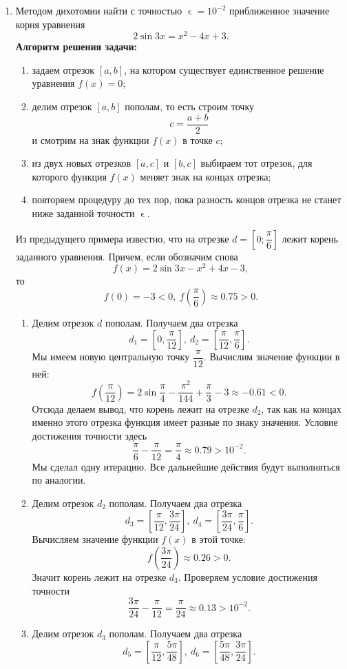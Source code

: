 \documentclass[a4paper, 12pt]{report}
\renewcommand{\epsilon}{\upvarepsilon}
\begin{document}
\begin{enumerate}
		\item Методом дихотомии найти с точностью $\epsilon=10^{-2}$ приближенное значение корня уравнения $$2\sin3x = x^2 - 4x + 3.$$
		\textbf{Алгоритм решения задачи:}
		\begin{enumerate}
			\item задаем отрезок $[a,b]$, на котором существует единственное решение уравнения $f(x) = 0$;
			\item делим отрезок $[a,b]$ пополам, то есть строим точку $$c = \dfrac{a+b}{2}$$ и смотрим на знак функции $f(x)$ в точке $c$;
			\item из двух новых отрезков $[a,c]$ и $[b,c]$ выбираем тот отрезок, для которого функция $f(x)$ меняет знак на концах отрезка;
			\item повторяем процедуру до тех пор, пока разность концов отрезка не станет ниже заданной точности $\epsilon$.
		\end{enumerate}
		Из предыдущего примера известно, что на отрезке $d = \left[0; \dfrac\pi6\right]$ лежит корень заданного уравнения. Причем, если обозначим снова $$f(x) = 2\sin 3x - x^2 + 4x - 3,$$ то $$f(0) = -3 < 0,\ f\left(\dfrac \pi 6\right)\approx 0.75 > 0.$$
		\begin{enumerate}
			\item Делим отрезок $d$ пополам. Получаем два отрезка $$d_1 = \left[0, \dfrac \pi {12}\right],\ d_2 = \left[\dfrac \pi {12}, \dfrac \pi {6}\right].$$ 
			Мы имеем новую центральную точку $\dfrac \pi {12}$. Вычислим значение функции в ней: $$f\left(\dfrac{\pi}{12}\right) = 2\sin \dfrac{\pi}{4} - \dfrac{\pi^2}{144} + \dfrac{\pi}3 - 3 \approx -0.61 < 0.$$
			Отсюда делаем вывод, что корень лежит на отрезке $d_2$, так как на концах именно этого отрезка функция имеет разные по знаку значения. Условие достижения точности здесь $$\dfrac{\pi}{6} - \dfrac{\pi}{12} = \dfrac \pi 4\approx 0.79 > 10^{-2}.$$
			Мы сделал одну итерацию. Все дальнейшие действия будут выполняться по аналогии.
			\item Делим отрезок $d_2$ пополам. Получаем два отрезка $$d_3 = \left[\dfrac \pi {12}, \dfrac {3\pi} {24}\right],\ d_4 = \left[\dfrac {3\pi} {24}, \dfrac \pi {6}\right].$$ 
			Вычисляем значение функции $f(x)$ в этой точке:
			$$f\left(\dfrac{3\pi}{24}\right) \approx 0.26 > 0.$$
			Значит корень лежит на отрезке $d_3$. Проверяем условие достижения точности $$\dfrac{3\pi}{24} - \dfrac{\pi}{12} = \dfrac \pi{24}\approx 0.13 > 10^{-2}.$$ 
			\item Делим отрезок $d_3$ пополам. Получаем два отрезка $$d_5 = \left[\dfrac \pi {12}, \dfrac {5\pi} {48}\right],\ d_6 = \left[\dfrac {5\pi} {48}, \dfrac {3\pi} {24}\right].$$ 

\end{enumerate}
\end{enumerate}
\end{document}
